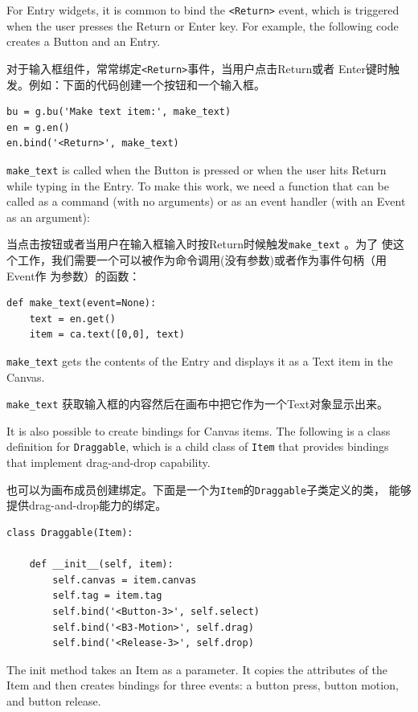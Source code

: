 \documentclass[10pt]{book}
\begin{document}
\begin{CJK}{UTF8}{gbsn}
For Entry widgets, it is common to bind the \verb"<Return>" event,
which is triggered when the user presses the {\sf Return} or
{\sf Enter} key.  For example, the following code creates a Button
and an Entry.

对于输入框组件，常常绑定\verb"<Return>"事件，当用户点击{\sf Return}或者{\sf
Enter}键时触发。例如：下面的代码创建一个按钮和一个输入框。

\begin{verbatim}
bu = g.bu('Make text item:', make_text)
en = g.en()
en.bind('<Return>', make_text)
\end{verbatim}
%
\verb"make_text" is called when the Button is pressed or when
the user hits {\sf Return} while typing in the Entry.  To make
this work, we need a function that can be called as a command
(with no arguments) or as an event handler (with an Event
as an argument):

当点击按钮或者当用户在输入框输入时按{\sf Return}时候触发\verb"make_text" 。为了
使这个工作，我们需要一个可以被作为命令调用(没有参数)或者作为事件句柄（用Event作
为参数）的函数：

\begin{verbatim}
def make_text(event=None):
    text = en.get()
    item = ca.text([0,0], text)
\end{verbatim}
%
\verb"make_text" gets the contents of the Entry and displays
it as a Text item in the Canvas.

\verb"make_text" 获取输入框的内容然后在画布中把它作为一个Text对象显示出来。

It is also possible to create bindings for Canvas items.
The following is a class definition for {\tt Draggable},
which is a child class of {\tt Item} that provides bindings
that implement drag-and-drop capability.

也可以为画布成员创建绑定。下面是一个为{\tt Item}的{\tt Draggable}子类定义的类，
能够提供drag-and-drop能力的绑定。

\begin{verbatim}
class Draggable(Item):

    def __init__(self, item):
        self.canvas = item.canvas
        self.tag = item.tag
        self.bind('<Button-3>', self.select)
        self.bind('<B3-Motion>', self.drag)
        self.bind('<Release-3>', self.drop)
\end{verbatim}
%
The init method takes an Item as a parameter.  It copies
the attributes of the Item and then creates bindings for
three events: a button press, button motion, and button release.


\end{CJK}
\end{document}
